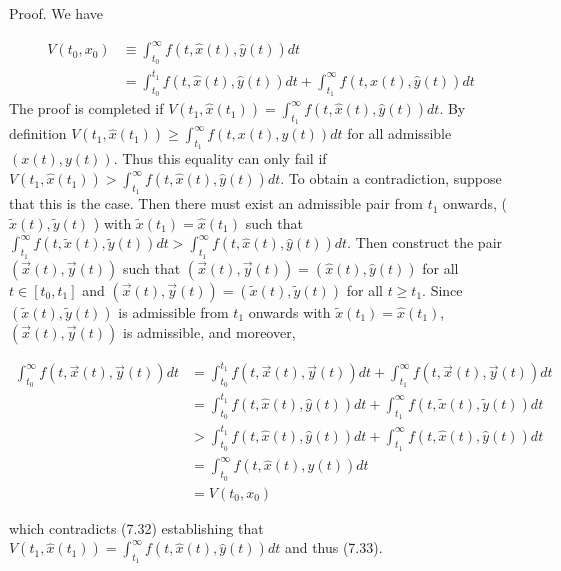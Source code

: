 \documentclass[\topdir/lecture_notes.tex]{subfiles}
\begin{document}
Proof. We have

\[
\begin{aligned}
V\left(t_{0}, x_{0}\right) & \equiv \int_{t_{0}}^{\infty} f(t, \hat{x}(t), \hat{y}(t)) d t \\
& =\int_{t_{0}}^{t_{1}} f(t, \hat{x}(t), \hat{y}(t)) d t+\int_{t_{1}}^{\infty} f(t, \hat{x}(t), \hat{y}(t)) d t
\end{aligned}
\]
The proof is completed if $V\left(t_{1}, \hat{x}\left(t_{1}\right)\right)=\int_{t_{1}}^{\infty} f(t, \hat{x}(t), \hat{y}(t)) d t$. By definition $V\left(t_{1}, \hat{x}\left(t_{1}\right)\right) \geq \int_{t_{1}}^{\infty} f(t, x(t), y(t)) d t$ for all admissible $(x(t), y(t))$. Thus this equality can only fail if $V\left(t_{1}, \hat{x}\left(t_{1}\right)\right)>\int_{t_{1}}^{\infty} f(t, \hat{x}(t), \hat{y}(t)) d t$. To obtain a contradiction, suppose that this is the case. Then there must exist an admissible pair from $t_1$ onwards, ( $\tilde{x}(t), \tilde{y}(t)$ ) with $\tilde{x}\left(t_{1}\right)=\hat{x}\left(t_{1}\right)$ such that $\int_{t_{1}}^{\infty} f(t, \tilde{x}(t), \tilde{y}(t)) d t>\int_{t_{1}}^{\infty} f(t, \hat{x}(t), \hat{y}(t)) d t$. Then construct the pair $(\vec{x}(t), \vec{y}(t))$ such that $(\vec{x}(t), \vec{y}(t))=(\hat{x}(t), \hat{y}(t))$ for all $t \in\left[t_{0}, t_{1}\right]$ and $(\vec{x}(t), \vec{y}(t))= (\tilde{x}(t), \tilde{y}(t))$ for all $t \geq t_{1}$. Since $(\tilde{x}(t), \tilde{y}(t))$ is admissible from $t_1$ onwards with $\tilde{x}\left(t_{1}\right)=\hat{x}\left(t_{1}\right)$, $(\vec{x}(t), \vec{y}(t))$ is admissible, and moreover,

\[
\begin{aligned}
\int_{t_{0}}^{\infty} f(t, \vec{x}(t), \vec{y}(t)) d t & =\int_{t_{0}}^{t_{1}} f(t, \vec{x}(t), \vec{y}(t)) d t+\int_{t_{1}}^{\infty} f(t, \vec{x}(t), \vec{y}(t)) d t \\
& =\int_{t_{0}}^{t_{1}} f(t, \hat{x}(t), \hat{y}(t)) d t+\int_{t_{1}}^{\infty} f(t, \tilde{x}(t), \tilde{y}(t)) d t \\
& >\int_{t_{0}}^{t_{1}} f(t, \hat{x}(t), \hat{y}(t)) d t+\int_{t_{1}}^{\infty} f(t, \hat{x}(t), \hat{y}(t)) d t \\
& =\int_{t_{0}}^{\infty} f(t, \hat{x}(t), \hat{y}(t)) d t \\
& =V\left(t_{0}, x_{0}\right)
\end{aligned}
\]

which contradicts (7.32) establishing that $V\left(t_{1}, \hat{x}\left(t_{1}\right)\right)=\int_{t_{1}}^{\infty} f(t, \hat{x}(t), \hat{y}(t)) d t$ and thus (7.33).
\end{document}
